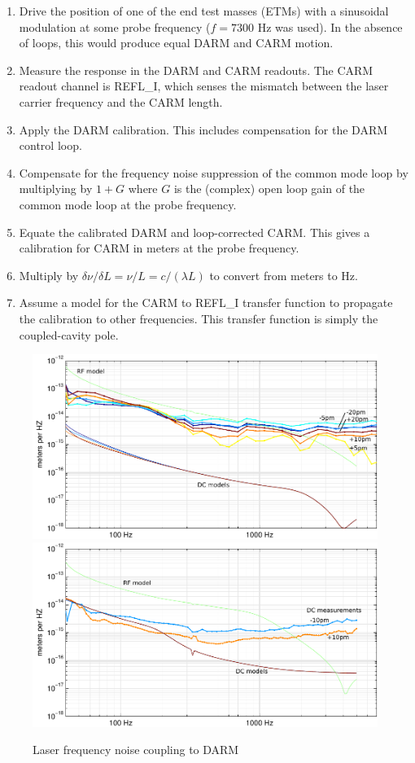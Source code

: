 \begin{enumerate}
\item Drive the position of one of the end test masses (ETMs) with a
  sinusoidal modulation at some probe frequency ($f=7300$ Hz was
  used).  In the absence of loops, this would produce equal DARM and
  CARM motion.
\item Measure the response in the DARM and CARM readouts.  The CARM
  readout channel is REFL\_I, which senses the mismatch between the
  laser carrier frequency and the CARM length.
\item Apply the DARM calibration.  This includes compensation for the
  DARM control loop.
\item Compensate for the frequency noise suppression of the common
  mode loop by multiplying by $1+G$ where $G$ is the (complex) open
  loop gain of the common mode loop at the probe frequency.
\item Equate the calibrated DARM and loop-corrected CARM.  This gives
  a calibration for CARM in meters at the probe frequency.
\item Multiply by $\delta\nu/\delta L = \nu/L = c/(\lambda L)$ to
  convert from meters to Hz.
\item Assume a model for the CARM to REFL\_I transfer function to
  propagate the calibration to other frequencies.  This transfer
  function is simply the coupled-cavity pole\cite[eq. 3.5]{RanaThesis}.
\end{enumerate}

\begin{figure}
\includegraphics[]{figures/laserFM-L1.pdf}
\includegraphics[]{figures/laserFM-H1.pdf}
\caption[Laser frequency noise coupling (measured and modeled)]{Laser frequency noise coupling to DARM}
\end{figure}

